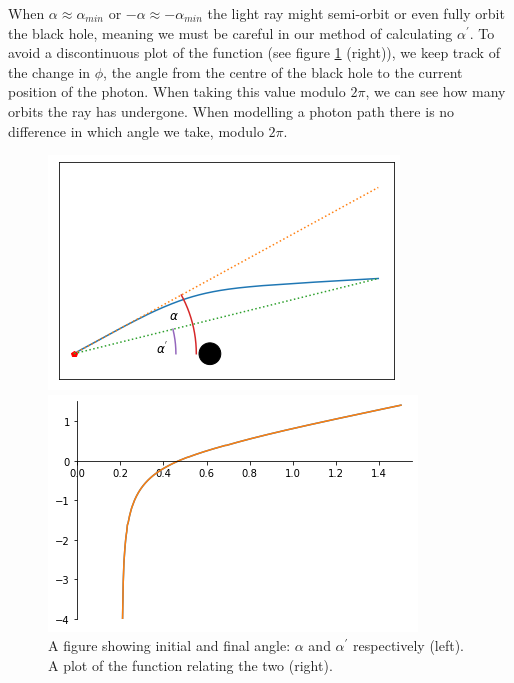 \documentclass[oneside,openright,frontopenright, singlespacing]{dmathesis}
\begin{document}
\vspace{1em}
	When $\alpha \approx \alpha_{min}$ or $-\alpha \approx -\alpha_{min}$ the light ray might semi-orbit or even fully orbit the black hole, meaning we must be careful in our method of calculating $\alpha^{'}$. To avoid a discontinuous plot of the function (see figure \ref{fig:Figure3.3} (right)), we keep track of the change in $\phi$, the angle from the centre of the black hole to the current position of the photon. When taking this value modulo $2\pi$, we can see how many orbits the ray has undergone. When modelling a photon path there is no difference in which angle we take, modulo $2\pi$.

\begin{figure}[!ht]
	\centering
	\begin{minipage}{0.5\textwidth}
		\centering
		\includegraphics[height=0.5\linewidth]{img/alpha_alpha-prime}
	\end{minipage}%
	\hfill
	\begin{minipage}{0.5\textwidth}
		\centering
		\includegraphics[height=0.5\linewidth]{img/alpha-prime_f(alpha)}
	\end{minipage}
	\caption{A figure showing initial and final angle: $\alpha$ and $\alpha^{'}$ respectively (left). A plot of the function relating the two (right).}
	\label{fig:Figure3.3}
\end{figure}
\end{document}
